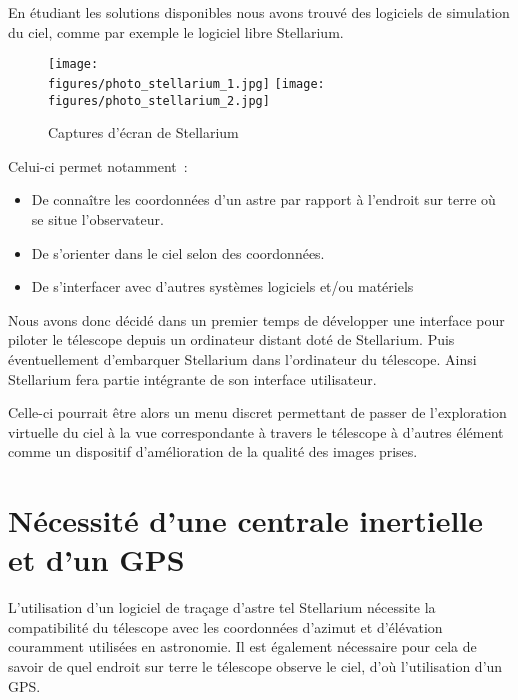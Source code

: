 \vspace{1cm}

En étudiant les solutions disponibles nous avons trouvé des logiciels de simulation du ciel, comme par exemple le logiciel libre Stellarium.

\begin{figure}[H]
    \centering
    \texttt{[image: \\figures/photo\_stellarium\_1.jpg]}
	\texttt{[image: \\figures/photo\_stellarium\_2.jpg]}
    \decoRule
    \caption[
    Captures d'écran de Stellarium]{
    Captures d'écran de Stellarium}
    \label{fig:Captures d'écran de Stellarium}
    \end{figure}

\vspace{1cm}

Celui-ci permet notamment~:
\begin{itemize}[label=$\bullet$]
	\item De connaître les coordonnées d'un astre par rapport à l'endroit sur terre où se situe l'observateur.
	\item De s'orienter dans le ciel selon des coordonnées.
	\item De s'interfacer avec d'autres systèmes logiciels et/ou matériels
	\end{itemize}

Nous avons donc décidé dans un premier temps de développer une interface pour piloter le télescope depuis un ordinateur distant doté de Stellarium. Puis éventuellement d'embarquer Stellarium dans l'ordinateur du télescope. Ainsi Stellarium fera partie intégrante de son interface utilisateur.

Celle-ci pourrait être alors un menu discret permettant de passer de l'exploration virtuelle du ciel à la vue correspondante à travers le télescope à d'autres élément comme un dispositif d'amélioration de la qualité des images prises.

\section{Nécessité d'une centrale inertielle et d'un GPS}

L'utilisation d'un logiciel de traçage d'astre tel Stellarium nécessite la compatibilité du télescope avec les coordonnées d'azimut et d'élévation couramment utilisées en astronomie. Il est également nécessaire pour cela de savoir de quel endroit sur terre le télescope observe le ciel, d'où l'utilisation d'un GPS.

